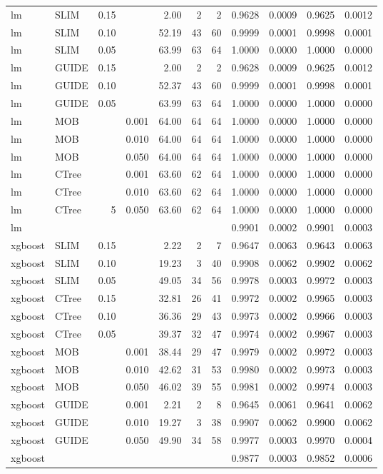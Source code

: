 \begin{table}
\begin{tabular}[t]{l|l|r|r|r|r|r|r|r|r|r}
\hline
lm & SLIM & 0.15 & & 2.00 & 2 & 2 & 0.9628 & 0.0009 & 0.9625 & 0.0012\\
lm & SLIM & 0.10 & & 52.19 & 43 & 60 & 0.9999 & 0.0001 & 0.9998 & 0.0001\\
lm & SLIM & 0.05 & & 63.99 & 63 & 64 & 1.0000 & 0.0000 & 1.0000 & 0.0000\\
lm & GUIDE & 0.15 &  & 2.00 & 2 & 2 & 0.9628 & 0.0009 & 0.9625 & 0.0012\\
lm & GUIDE & 0.10 &  & 52.37 & 43 & 60 & 0.9999 & 0.0001 & 0.9998 & 0.0001\\
lm & GUIDE & 0.05 & & 63.99 & 63 & 64 & 1.0000 & 0.0000 & 1.0000 & 0.0000\\
lm & MOB & & 0.001 & 64.00 & 64 & 64 & 1.0000 & 0.0000 & 1.0000 & 0.0000\\
lm & MOB & & 0.010 & 64.00 & 64 & 64 & 1.0000 & 0.0000 & 1.0000 & 0.0000\\
lm & MOB & & 0.050 & 64.00 & 64 & 64 & 1.0000 & 0.0000 & 1.0000 & 0.0000\\
lm & CTree & & 0.001 & 63.60 & 62 & 64 & 1.0000 & 0.0000 & 1.0000 & 0.0000\\
lm & CTree & & 0.010 & 63.60 & 62 & 64 & 1.0000 & 0.0000 & 1.0000 & 0.0000\\
lm & CTree &5 & 0.050 & 63.60 & 62 & 64 & 1.0000 & 0.0000 & 1.0000 & 0.0000\\
\hline
lm & & & & & & & 0.9901 & 0.0002 & 0.9901 & 0.0003\\
\hline



xgboost & SLIM & 0.15 & & 2.22 & 2 & 7 & 0.9647 & 0.0063 & 0.9643 & 0.0063\\
xgboost & SLIM & 0.10 & & 19.23 & 3 & 40 & 0.9908 & 0.0062 & 0.9902 & 0.0062\\
xgboost & SLIM & 0.05 & & 49.05 & 34 & 56 & 0.9978 & 0.0003 & 0.9972 & 0.0003\\
xgboost & CTree & 0.15 & & 32.81 & 26 & 41 & 0.9972 & 0.0002 & 0.9965 & 0.0003\\
xgboost & CTree & 0.10 & & 36.36 & 29 & 43 & 0.9973 & 0.0002 & 0.9966 & 0.0003\\
xgboost & CTree & 0.05 & & 39.37 & 32 & 47 & 0.9974 & 0.0002 & 0.9967 & 0.0003\\
xgboost & MOB & & 0.001 & 38.44 & 29 & 47 & 0.9979 & 0.0002 & 0.9972 & 0.0003\\
xgboost & MOB & & 0.010 & 42.62 & 31 & 53 & 0.9980 & 0.0002 & 0.9973 & 0.0003\\
xgboost & MOB & & 0.050 & 46.02 & 39 & 55 & 0.9981 & 0.0002 & 0.9974 & 0.0003\\
xgboost & GUIDE & & 0.001 & 2.21 & 2 & 8 & 0.9645 & 0.0061 & 0.9641 & 0.0062\\
xgboost & GUIDE & & 0.010 & 19.27 & 3 & 38 & 0.9907 & 0.0062 & 0.9900 & 0.0062\\
xgboost & GUIDE & & 0.050 & 49.90 & 34 & 58 & 0.9977 & 0.0003 & 0.9970 & 0.0004\\
\hline
xgboost & & & & & & & 0.9877 & 0.0003 & 0.9852 & 0.0006\\
\hline


\end{tabular}
\end{table}
